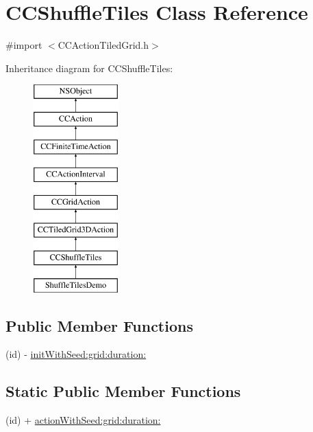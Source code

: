 \hypertarget{interface_c_c_shuffle_tiles}{\section{C\-C\-Shuffle\-Tiles Class Reference}
\label{interface_c_c_shuffle_tiles}
}


{\ttfamily \#import $<$C\-C\-Action\-Tiled\-Grid.\-h$>$}

Inheritance diagram for C\-C\-Shuffle\-Tiles\-:\begin{figure}[H]
\begin{center}
\leavevmode
\includegraphics[height=8.000000cm]{interface_c_c_shuffle_tiles}
\end{center}
\end{figure}
\subsection*{Public Member Functions}
\begin{DoxyCompactItemize}
\item 
(id) -\/ \hyperlink{interface_c_c_shuffle_tiles_a963e3e36bf67d22575ae949b7a56477f}{init\-With\-Seed\-:grid\-:duration\-:}
\end{DoxyCompactItemize}
\subsection*{Static Public Member Functions}
\begin{DoxyCompactItemize}
\item 
(id) + \hyperlink{interface_c_c_shuffle_tiles_acbe478d597e7b1edc4054f894b4c6970}{action\-With\-Seed\-:grid\-:duration\-:}
\end{DoxyCompactItemize}
